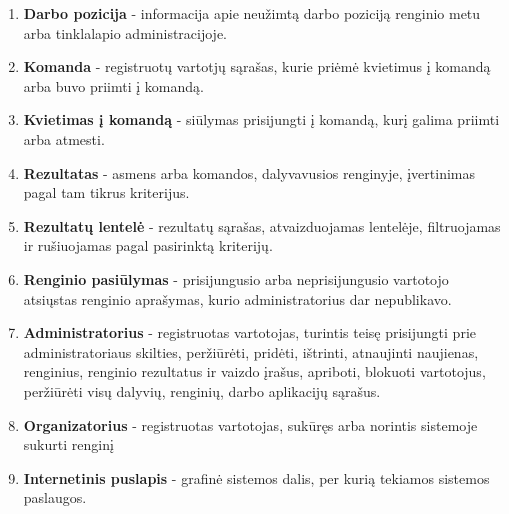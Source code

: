 \documentclass{VUMIFPSkursinis}
\begin{document}
\begin{enumerate}[label=\textbf{E\arabic*.}]
					\item \textbf{Darbo pozicija} - informacija apie neužimtą darbo poziciją renginio metu arba tinklalapio administracijoje.
					\item \textbf{Komanda} - registruotų vartotjų sąrašas, kurie priėmė kvietimus į komandą arba buvo priimti į komandą.
					\item \textbf{Kvietimas į komandą} - siūlymas prisijungti į komandą, kurį galima priimti arba atmesti.
					\item \textbf{Rezultatas} - asmens arba komandos, dalyvavusios renginyje, įvertinimas pagal tam tikrus kriterijus.
					\item \textbf{Rezultatų lentelė} - rezultatų sąrašas, atvaizduojamas lentelėje, filtruojamas ir rušiuojamas pagal pasirinktą kriterijų.
					\item \textbf{Renginio pasiūlymas} - prisijungusio arba neprisijungusio vartotojo atsiųstas renginio aprašymas, kurio administratorius dar nepublikavo.
					\item \textbf{Administratorius} - registruotas vartotojas, turintis teisę prisijungti prie administratoriaus skilties, peržiūrėti, pridėti, ištrinti, atnaujinti naujienas, renginius, renginio rezultatus ir vaizdo įrašus, apriboti, blokuoti vartotojus, peržiūrėti visų dalyvių, renginių, darbo aplikacijų sąrašus.
					\item \textbf{Organizatorius } - registruotas vartotojas, sukūręs arba norintis sistemoje sukurti renginį
					\item \textbf{Internetinis puslapis } - grafinė sistemos dalis, per kurią tekiamos sistemos paslaugos.
            \end{enumerate}
\end{document}
